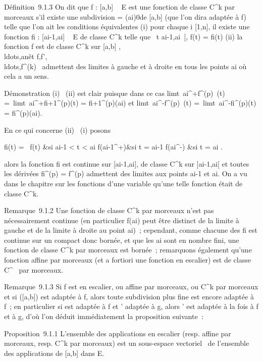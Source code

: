 Définition~9.1.3 On dit que f : {[}a,b{]} \rightarrow~ E est une fonction de classe
C^k par morceaux s'il existe une subdivision \sigma =
(ai)0\leqi\leqn de {[}a,b{]} (que l'on dira adaptée à f)
telle que l'on ait les conditions équivalentes (i) pour chaque i \in
{[}1,n{]}, il existe une fonction fi :
{[}ai-1,ai{]} \rightarrow~ E de classe C^k telle que
\forall~t \in{]}ai-1,ai~{[}, f(t) =
fi(t) (ii) la fonction f est de classe C^k sur
{[}a,b{]}
\diagdown{},\\ldots,an\~
et
f,f',\\ldots,f^(k)~
admettent des limites à gauche et à droite en tous les points
ai où cela a un sens.

Démonstration (i) \rigtharrow~(ii) est clair puisque dans ce cas
limt\rightarrow~ai^+f^(p)~(t)
=\
limt\rightarrow~ai^+fi+1^(p)(t) =
fi+1^(p)(ai) et
limt\rightarrow~ai^-f^(p)~(t)
=\
limt\rightarrow~ai^-fi^(p)(t) =
fi^(p)(ai).

En ce qui concerne (ii) \rigtharrow~(i) posons

 fi(t) = \left \
\cases f(t) &si ai-1 \textless{} t
\textless{} ai \cr
f(ai-1^+)&si t = ai-1 \cr
f(ai^-) &si t = ai  \right
.

alors la fonction fi est continue sur
{[}ai-1,ai{]}, de classe C^k sur
{]}ai-1,ai{[} et toutes les dérivées
fi^(p) = f^(p) admettent des limites aux
points ai-1 et ai. On a vu dans le chapitre sur les
fonctions d'une variable qu'une telle fonction était de classe
C^k.

Remarque~9.1.2 Une fonction de classe C^k par morceaux n'est
pas nécessairement continue (en particulier f(ai) peut être
distinct de la limite à gauche et de la limite à droite au point
ai)~; cependant, comme chacune des fi est continue
sur un compact donc bornée, et que les ai sont en nombre fini,
une fonction de classe C^k par morceaux est bornée~;
remarquons également qu'une fonction affine par morceaux (et a fortiori
une fonction en escalier) est de classe C^\infty~ par morceaux.

Remarque~9.1.3 Si f est en escalier, ou affine par morceaux, ou
C^k par morceaux et si \sigma \inS({[}a,b{]}) est adaptée à f, alors
toute subdivision plus fine est encore adaptée à f~; en particulier si \sigma
est adaptée à f et \sigma' adaptée à g, alors \sigma \cup \sigma' est adaptée à la fois à
f et à g, d'où l'on déduit immédiatement la proposition suivante~:

Proposition~9.1.1 L'ensemble des applications en escalier (resp. affine
par morceaux, resp. C^k par morceaux) est un sous-espace
vectoriel ~de l'ensemble des applications de {[}a,b{]} dans E.

